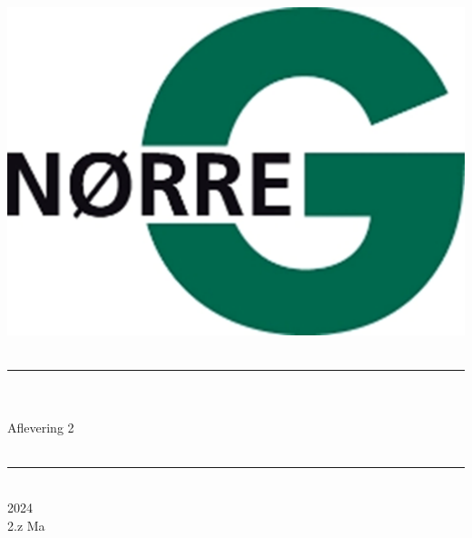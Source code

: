 \documentclass[12pt,x11names,a4paper]{article}
\begin{document}
%

\begin{titlepage}

\begin{minipage}{0.27\textwidth}

\end{minipage}
\begin{minipage}{0.73\textwidth}
\begin{center}
\phantom{h} \vspace{1cm}\\
\hspace{4cm}
\includegraphics[scale = 1]{Billeder/Norreg.png} \\
\phantom{h} \vspace{5cm}\\
\rule{0.7\textwidth}{0.3mm}\\
\phantom{h}\\
{\fontsize{50}{60}\selectfont Aflevering 2}\\
\phantom{h}\\
\rule{0.7\textwidth}{0.3mm}\\
\Large 2024\\
\Large 2.z Ma

\end{center}
\end{minipage}
\end{titlepage}
\end{document}
